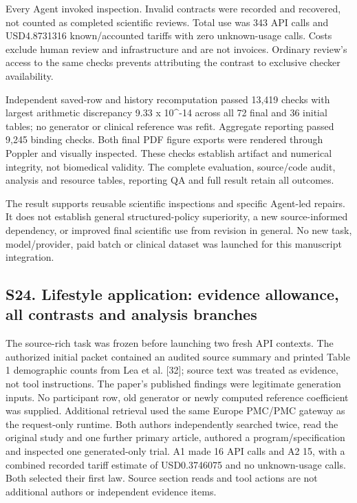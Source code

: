 \documentclass[11pt,letterpaper]{article}
\begin{document}
\endgroup

Every Agent invoked inspection. Invalid contracts were recorded and recovered, not counted as completed scientific reviews. Total use was 343 API calls and USD4.8731316 known/\allowbreak{}accounted tariffs with zero unknown-usage calls. Costs exclude human review and infrastructure and are not invoices. Ordinary review's access to the same checks prevents attributing the contrast to exclusive checker availability.


Independent saved-row and history recomputation passed 13,419 checks with largest arithmetic discrepancy 9.33 x 10\textasciicircum{}-14 across all 72 final and 36 initial tables; no generator or clinical reference was refit. Aggregate reporting passed 9,245 binding checks. Both final PDF figure exports were rendered through Poppler and visually inspected. These checks establish artifact and numerical integrity, not biomedical validity. The complete evaluation, source/\allowbreak{}code audit, analysis and resource tables, reporting QA and full result retain all outcomes.


The result supports reusable scientific inspections and specific Agent-led repairs. It does not establish general structured-policy superiority, a new source-informed dependency, or improved final scientific use from revision in general. No new task, model/\allowbreak{}provider, paid batch or clinical dataset was launched for this manuscript integration.


\clearpage

\subsection*{S24. Lifestyle application: evidence allowance, all contrasts and analysis branches}

The source-rich task was frozen before launching two fresh API contexts. The authorized initial packet contained an audited source summary and printed Table 1 demographic counts from Lea et al. [32]; source text was treated as evidence, not tool instructions. The paper's published findings were legitimate generation inputs. No participant row, old generator or newly computed reference coefficient was supplied. Additional retrieval used the same Europe PMC/\allowbreak{}PMC gateway as the request-only runtime. Both authors independently searched twice, read the original study and one further primary article, authored a program/\allowbreak{}specification and inspected one generated-only trial. A1 made 16 API calls and A2 15, with a combined recorded tariff estimate of USD0.3746075 and no unknown-usage calls. Both selected their first law. Source section reads and tool actions are not additional authors or independent evidence items.
\end{document}
